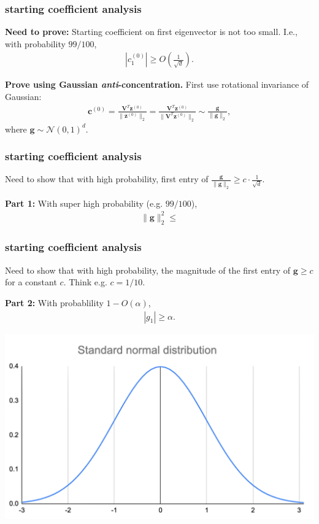 \documentclass[compress]{beamer}
\newcommand{\bv}[1]{\mathbf{#1}}
\begin{document}
\begin{frame}[t]
		\frametitle{starting coefficient analysis}
	\textbf{Need to prove:} Starting coefficient on first eigenvector is not too small. I.e., with probability $99/100$,
	\begin{align*}
		\left| c_1^{(0)}\right| \geq   O\left(\frac{1}{\sqrt{d}}\right). 
	\end{align*}
	
	\textbf{Prove using Gaussian \emph{anti}-concentration.}
	First use rotational invariance of Gaussian:
	\vspace{-.5em}
	\begin{align*}
		\bv{c}^{(0)} = \frac{\bv{V}^T \bv{z}^{(0)}}{\| \bv{z}^{(0)}\|_2} =  \frac{\bv{V}^T \bv{z}^{(0)}}{\| \bv{V}^T\bv{z}^{(0)}\|_2} \sim \frac{\bv{g}}{\| \bv{g}\|_2}, 
	\end{align*}
	where $\bv{g} \sim \mathcal{N}(0,1)^d$.
\end{frame}

\begin{frame}[t]
	\frametitle{starting coefficient analysis}
	Need to show that with high probability, first entry of $\frac{\bv{g}}{\| \bv{g}\|_2} \geq c\cdot \frac{1}{\sqrt{d}}$. 
	
	\textbf{Part 1:}
	With super high probability (e.g. $99/100$), 
	\begin{align*}
		\|\bv{g}\|_2^2 \leq 
	\end{align*}
\end{frame}

\begin{frame}[t]
	\frametitle{starting coefficient analysis}
	Need to show that with high probability, the magnitude of the first entry of ${\bv{g}} \geq c$ for a constant $c$. Think e.g. $c = 1/10$.
	
	\textbf{Part 2:}
	With probablility $1 - O(\alpha)$,
	\begin{align*}
		|{g}_1| \geq  \alpha.
	\end{align*}
\vspace{-1em}

	\begin{center}
		\includegraphics[width=.6\textwidth]{basic_gauss.png}
	\end{center}
\end{frame}
\end{document}

